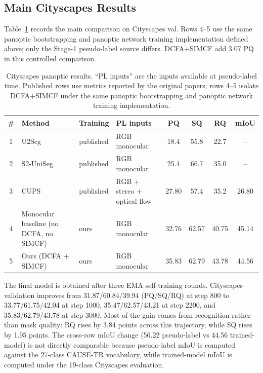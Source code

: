 \documentclass[10pt,twocolumn,letterpaper]{article}
\begin{document}
\subsection{Main Cityscapes Results}
\label{sec:exp:main}

Table~\ref{tab:main} records the main comparison on Cityscapes val. Rows 4--5 use the same panoptic bootstrapping and panoptic network training implementation defined above; only the Stage-1 pseudo-label source differs. DCFA+SIMCF add 3.07 PQ in this controlled comparison.

\begin{table}[t]
\centering
\small
\setlength{\tabcolsep}{4pt}
\begin{tabular}{c l l l c c c c}
\toprule
\# & Method & Training & PL inputs & PQ & SQ & RQ & mIoU \\
\midrule
1 & U2Seg~\cite{niu2024u2seg} & published & RGB monocular & 18.4 & 55.8 & 22.7 & -- \\
2 & S2-UniSeg~\cite{xu2025s2uniseg} & published & RGB monocular & 25.4 & 66.7 & 35.0 & -- \\
3 & CUPS~\cite{hahn2025cups} & published & RGB + stereo + optical flow & 27.80 & 57.4 & 35.2 & 26.80 \\
4 & Monocular baseline (no DCFA, no SIMCF) & ours & RGB monocular & 32.76 & 62.57 & 40.75 & 45.14 \\
5 & Ours (DCFA + SIMCF) & ours & RGB monocular & 35.83 & 62.79 & 43.78 & 44.56 \\
\bottomrule
\end{tabular}
\caption{Cityscapes panoptic results. ``PL inputs'' are the inputs available at pseudo-label time. Published rows use metrics reported by the original papers; rows 4--5 isolate DCFA+SIMCF under the same panoptic bootstrapping and panoptic network training implementation.}
\label{tab:main}
\end{table}

The final model is obtained after three EMA self-training rounds. Cityscapes validation improves from 31.87/60.84/39.94 (PQ/SQ/RQ) at step 800 to 33.77/61.75/42.04 at step 1000, 35.47/62.57/43.21 at step 2200, and 35.83/62.79/43.78 at step 3000. Most of the gain comes from recognition rather than mask quality: RQ rises by 3.84 points across this trajectory, while SQ rises by 1.95 points. The cross-row mIoU change (56.22 pseudo-label vs 44.56 trained-model) is not directly comparable because pseudo-label mIoU is computed against the 27-class CAUSE-TR vocabulary, while trained-model mIoU is computed under the 19-class Cityscapes evaluation.
\end{document}
